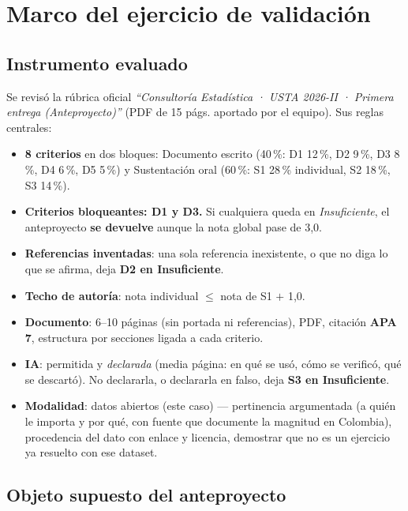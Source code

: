 \section{Marco del ejercicio de validación}

\subsection{Instrumento evaluado}

Se revisó la rúbrica oficial \emph{``Consultoría Estadística · USTA 2026-II ·
Primera entrega (Anteproyecto)''} (PDF de 15 págs. aportado por el equipo). Sus
reglas centrales:

\begin{itemize}
  \item \textbf{8 criterios} en dos bloques: Documento escrito (40\,\%: D1 12\,\%,
        D2 9\,\%, D3 8\,\%, D4 6\,\%, D5 5\,\%) y Sustentación oral (60\,\%:
        S1 28\,\% individual, S2 18\,\%, S3 14\,\%).
  \item \textbf{Criterios bloqueantes: D1 y D3.} Si cualquiera queda en
        \emph{Insuficiente}, el anteproyecto \textbf{se devuelve} aunque la nota
        global pase de 3,0.
  \item \textbf{Referencias inventadas}: una sola referencia inexistente, o que
        no diga lo que se afirma, deja \textbf{D2 en Insuficiente}.
  \item \textbf{Techo de autoría}: nota individual $\leq$ nota de S1 $+$ 1,0.
  \item \textbf{Documento}: 6--10 páginas (sin portada ni referencias), PDF,
        citación \textbf{APA 7}, estructura por secciones ligada a cada criterio.
  \item \textbf{IA}: permitida y \emph{declarada} (media página: en qué se usó,
        cómo se verificó, qué se descartó). No declararla, o declararla en
        falso, deja \textbf{S3 en Insuficiente}.
  \item \textbf{Modalidad}: datos abiertos (este caso) — pertinencia
        argumentada (a quién le importa y por qué, con fuente que documente la
        magnitud en Colombia), procedencia del dato con enlace y licencia,
        demostrar que no es un ejercicio ya resuelto con ese dataset.
\end{itemize}

\subsection{Objeto supuesto del anteproyecto}

